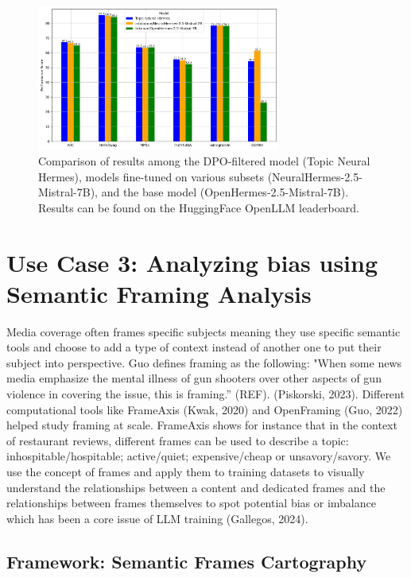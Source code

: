 \documentclass{article}
\begin{document}
\begin{figure}[h] %
  \centering %
  \includegraphics[width=8cm]{img/model_eval.png} %
  \caption{Comparison of results among the DPO-filtered model (Topic Neural Hermes), models fine-tuned on various subsets (NeuralHermes-2.5-Mistral-7B), and the base model (OpenHermes-2.5-Mistral-7B). Results can be found on the HuggingFace OpenLLM leaderboard.
} %
\end{figure}


\section{Use Case 3: Analyzing bias using Semantic Framing Analysis}

Media coverage often frames specific subjects meaning they use specific semantic tools and choose to add a type of context instead of another one to put their subject into perspective. Guo defines framing as the following: "When some news media emphasize the mental illness of gun shooters over other aspects of gun violence in covering the issue, this is framing.” (REF). (Piskorski, 2023). Different computational tools like FrameAxis (Kwak, 2020) and OpenFraming (Guo, 2022) helped study framing at scale. FrameAxis shows for instance that in the context of restaurant reviews, different frames can be used to describe a topic: inhospitable/hospitable; active/quiet; expensive/cheap or unsavory/savory. We use the concept of frames and apply them to training datasets to visually understand the relationships between a content and dedicated frames and the relationships between frames themselves to spot potential bias or imbalance which has been a core issue of LLM training (Gallegos, 2024). 

\subsection{Framework: Semantic Frames Cartography}
\end{document}
